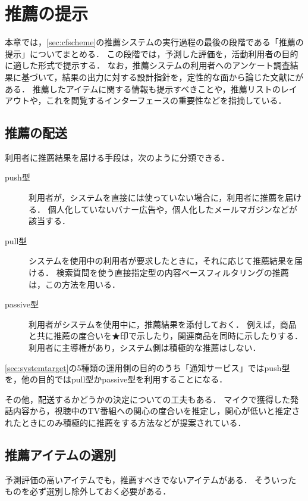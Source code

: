 \chapter{推薦の提示}
\label{chap:output}

本章では，\ref{sec:cfscheme}の推薦システムの実行過程の最後の段階である「推薦の提示」についてまとめる．
この段階では，予測した評価を，活動利用者の目的に適した形式で提示する．
なお，推薦システムの利用者へのアンケート調査結果に基づいて，結果の出力に対する設計指針を，定性的な面から論じた文献に\cite{sigir:01:01}がある．
推薦したアイテムに関する情報も提示すべきことや，推薦リストのレイアウトや，これを閲覧するインターフェースの重要性などを指摘している．

\section{推薦の配送}
\label{sec:present:delivery}

利用者に推薦結果を届ける手段は，次のように分類できる．
\begin{description}
 \item[push型]
 利用者が，システムを直接には使っていない場合に，利用者に推薦を届ける．
 個人化していないバナー広告や，個人化したメールマガジンなどが該当する．
 \item[pull型]
 システムを使用中の利用者が要求したときに，それに応じて推薦結果を届ける．
 検索質問を使う直接指定型の内容ベースフィルタリングの推薦は，この方法を用いる．
 \item[passive型]
 利用者がシステムを使用中に，推薦結果を添付しておく．
 例えば，商品と共に推薦の度合いを★印で示したり，関連商品を同時に示したりする．
 利用者に主導権があり，システム側は積極的な推薦はしない．
\end{description}
\ref{sec:systemtarget}の5種類の運用側の目的のうち「通知サービス」ではpush型を，他の目的ではpull型かpassive型を利用することになる．

その他，配送するかどうかの決定についての工夫もある．
マイクで獲得した発話内容から，視聴中のTV番組への関心の度合いを推定し，関心が低いと推定されたときにのみ積極的に推薦をする方法\cite{trjsai:07:01}などが提案されている．

\section{推薦アイテムの選別}
\label{sec:present:selection}

予測評価の高いアイテムでも，推薦すべきでないアイテムがある．
そういったものを必ず選別し除外しておく必要がある．

